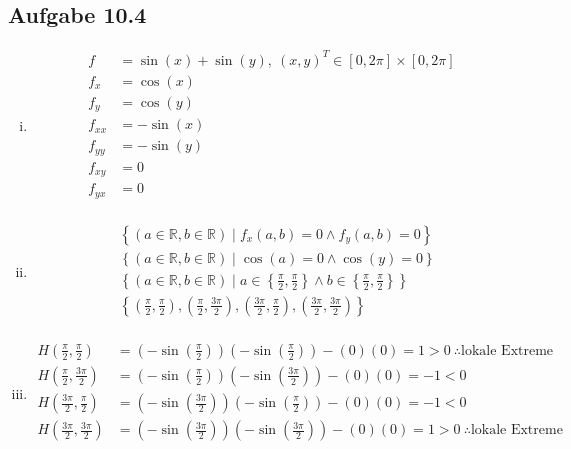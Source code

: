 \documentclass{standalone}
\begin{document}
\subsection{Aufgabe 10.4}
\begin{enumerate}[i)]
\item
    \begin{align*}
        f &= \sin(x) + \sin(y),\ (x,y)^T \in [0,2\pi] \times [0,2\pi] \\
        f_x &= \cos(x) \\
        f_y &= \cos(y) \\
        f_{xx} &= -\sin(x) \\
        f_{yy} &= -\sin(y) \\
        f_{xy} &= 0 \\
        f_{yx} &= 0 \\
    \end{align*}

\item
    \begin{align*}
        & \left\{ (a \in \mathbb{R}, b \in \mathbb{R}) \mid f_x(a,b) = 0 \wedge f_y(a,b) = 0 \right\} \\
        & \left\{ (a \in \mathbb{R}, b \in \mathbb{R}) \mid \cos(a) = 0 \wedge \cos(y) = 0 \right\} \\
        & \left\{ (a \in \mathbb{R}, b \in \mathbb{R}) \mid a \in \left\{ \frac{\pi}{2}, \frac{\pi}{2} \right\} \wedge b \in \left\{ \frac{\pi}{2}, \frac{\pi}{2} \right\} \right\} \\
        & \left\{ \left(\frac{\pi}{2}, \frac{\pi}{2}\right), \left(\frac{\pi}{2}, \frac{3\pi}{2}\right), \left(\frac{3\pi}{2}, \frac{\pi}{2}\right), \left(\frac{3\pi}{2}, \frac{3\pi}{2}\right) \right\} \\
    \end{align*}

\item
    \begin{align*}
        H\left(\frac{\pi}{2}, \frac{\pi}{2}\right) &= \left(-\sin\left(\frac{\pi}{2}\right)\right)\left(-\sin\left(\frac{\pi}{2}\right)\right)-(0)(0) = 1 > 0\ \therefore \text{lokale Extreme} \\
        H\left(\frac{\pi}{2}, \frac{3\pi}{2}\right) &= \left(-\sin\left(\frac{\pi}{2}\right)\right)\left(-\sin\left(\frac{3\pi}{2}\right)\right)-(0)(0) = -1 < 0 \\
        H\left(\frac{3\pi}{2}, \frac{\pi}{2}\right) &= \left(-\sin\left(\frac{3\pi}{2}\right)\right)\left(-\sin\left(\frac{\pi}{2}\right)\right)-(0)(0) = -1 < 0 \\
        H\left(\frac{3\pi}{2}, \frac{3\pi}{2}\right) &= \left(-\sin\left(\frac{3\pi}{2}\right)\right)\left(-\sin\left(\frac{3\pi}{2}\right)\right)-(0)(0) = 1 > 0\ \therefore \text{lokale Extreme} \\
    \end{align*}


\end{enumerate}
\end{document}
